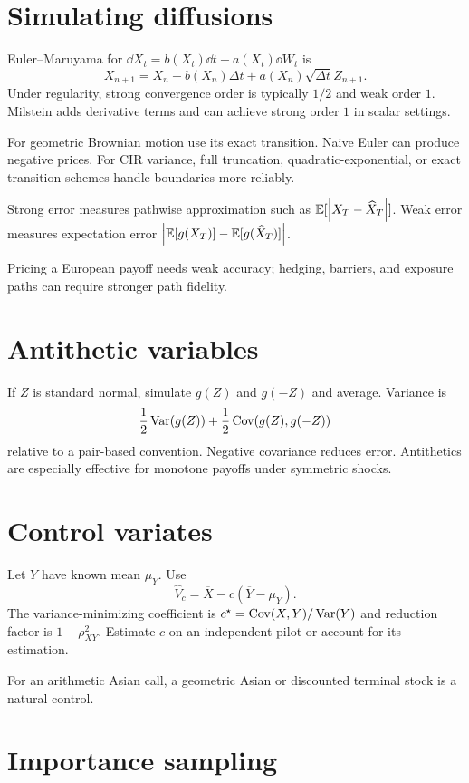 \section{Simulating diffusions}

Euler--Maruyama for
$\dd X_t=b(X_t)\dd t+a(X_t)\dd W_t$ is
\[
X_{n+1}=X_n+b(X_n)\Delta t+a(X_n)\sqrt{\Delta t}Z_{n+1}.
\]
Under regularity, strong convergence order is typically $1/2$ and weak order $1$.
Milstein adds derivative terms and can achieve strong order $1$ in scalar settings.

For geometric Brownian motion use its exact transition. Naive Euler can produce
negative prices. For CIR variance, full truncation, quadratic-exponential, or exact
transition schemes handle boundaries more reliably.

\begin{definition}
Strong error measures pathwise approximation such as
$\operatorname{\mathbb E}[\left|X_T-\widehat X_T\right|]$. Weak error measures expectation error
$\left|\operatorname{\mathbb E}[g(X_T)]-\operatorname{\mathbb E}[g(\widehat X_T)]\right|$.
\end{definition}

Pricing a European payoff needs weak accuracy; hedging, barriers, and exposure paths
can require stronger path fidelity.

\section{Antithetic variables}

If $Z$ is standard normal, simulate $g(Z)$ and $g(-Z)$ and average. Variance is
\[
\frac12\operatorname{Var}(g(Z))+\frac12\operatorname{Cov}(g(Z),g(-Z))
\]
relative to a pair-based convention. Negative covariance reduces error. Antithetics
are especially effective for monotone payoffs under symmetric shocks.

\section{Control variates}

Let $Y$ have known mean $\mu_Y$. Use
\[
\widehat V_c=\overline X-c(\overline Y-\mu_Y).
\]
The variance-minimizing coefficient is
$c^\star=\operatorname{Cov}(X,Y)/\operatorname{Var}(Y)$ and reduction factor is $1-\rho_{XY}^2$.
Estimate $c$ on an independent pilot or account for its estimation.

For an arithmetic Asian call, a geometric Asian or discounted terminal stock is a
natural control.

\section{Importance sampling}


